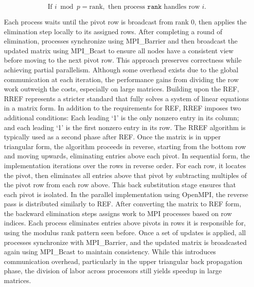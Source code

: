 \documentclass[12pt]{article}
\begin{document}
\[
\text{If } i \bmod p = \text{rank}, \text{ then process } \texttt{rank} \text{ handles row } i.
\]

Each process waits until the pivot row is broadcast from rank 0, then applies the elimination step locally to its assigned rows. After completing a round of elimination, processes synchronize using MPI\_Barrier and then broadcast the updated matrix using MPI\_Bcast to ensure all nodes have a consistent view before moving to the next pivot row. This approach preserves correctness while achieving partial parallelism. Although some overhead exists due to the global communication at each iteration, the performance gains from dividing the row work outweigh the costs, especially on large matrices.
Building upon the REF, RREF represents a stricter standard that fully solves a system of linear equations in a matrix form. In addition to the requirements for REF, RREF imposes two additional conditions: Each leading ‘1’ is the only nonzero entry in its column; and each leading ‘1’ is the first nonzero entry in its row. The RREF algorithm is typically used as a second phase after REF. Once the matrix is in upper triangular form, the algorithm proceeds in reverse, starting from the bottom row and moving upwards, eliminating entries above each pivot. In sequential form, the implementation iterations over the rows in reverse order. For each row, it locates the pivot, then eliminates all entries above that pivot by subtracting multiples of the pivot row from each row above. This back substitution stage ensures that each pivot is isolated. In the parallel implementation using OpenMPI, the reverse pass is distributed similarly to REF. After converting the matrix to REF form, the backward elimination steps assigns work to MPI processes based on row indices. Each process eliminates entries above pivots in rows it is responsible for, using the modulus rank pattern seen before. Once a set of updates is applied, all processes synchronize with MPI\_Barrier, and the updated matrix is broadcasted again using MPI\_Bcast to maintain consistency. While this introduces communication overhead, particularly in the upper triangular back propagation phase, the division of labor across processors still yields speedup in large matrices. 
\end{document}

